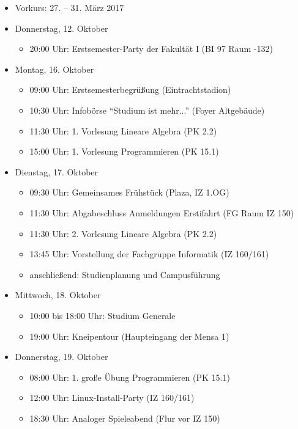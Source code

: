 \begin{itemize}
	\item Vorkurs: 27. – 31. März 2017
	\item Donnerstag, 12. Oktober
	\begin{itemize}
		\item 20:00 Uhr: Erstsemester-Party der Fakultät I (BI 97 Raum -132)
	\end{itemize}
	\item Montag, 16. Oktober
	\begin{itemize}
		\item 09:00 Uhr: Erstsemesterbegrüßung (Eintrachtstadion)
        \item 10:30 Uhr: Infobörse \enquote{Studium ist mehr...} (Foyer Altgebäude)
        \item 11:30 Uhr: 1. Vorlesung Lineare Algebra (PK 2.2)
        \item 15:00 Uhr: 1. Vorlesung Programmieren (PK 15.1)
	\end{itemize}
	\item Dienstag, 17. Oktober
	\begin{itemize}
		\item 09:30 Uhr: Gemeinsames Frühstück (Plaza, IZ 1.OG)
        \item 11:30 Uhr: Abgabeschluss Anmeldungen Erstifahrt (FG Raum IZ 150)
        \item 11:30 Uhr: 2. Vorlesung Lineare Algebra (PK 2.2)
        \item 13:45 Uhr: Vorstellung der Fachgruppe Informatik (IZ 160/161)
        \item anschließend: Studienplanung und Campusführung
	\end{itemize}
	\item Mittwoch, 18. Oktober
	\begin{itemize}
		\item 10:00 bis 18:00 Uhr: Studium Generale
        \item 19:00 Uhr: Kneipentour (Haupteingang der Mensa 1)
	\end{itemize}
	\item Donnerstag, 19. Oktober
	\begin{itemize}
		\item 08:00 Uhr: 1. große Übung Programmieren (PK 15.1)
        \item 12:00 Uhr: Linux-Install-Party (IZ 160/161)
        \item 18:30 Uhr: Analoger Spieleabend (Flur vor IZ 150)
	\end{itemize}

\end{itemize}
